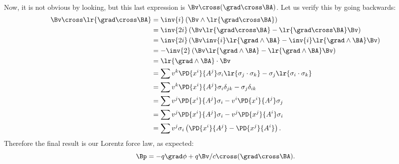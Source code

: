 {\begin{equation}
\begin{aligned}
\end{aligned}
\end{equation}
%
Now, it is not obvious by looking, but this last expression is \(\Bv \cross (\grad \cross \BA)\).  Let us verify this by going backwards:
%
\begin{equation}\label{eqn:tongMf1:640}
\begin{aligned}
\Bv \cross
\lr{ \grad \cross \BA }
&= \inv{i} \left( \Bv \wedge
\lr{  \grad \cross \BA  }
\right) \\
&= \inv{2i} \left( \Bv
\lr{  \grad \cross \BA  }
- \lr{  \grad \cross \BA  }
 \Bv \right) \\
&= \inv{2i} \left( \Bv \inv{i}
\lr{  \grad \wedge \BA  }
 - \inv{i}
\lr{  \grad \wedge \BA  }
 \Bv \right) \\
&= -\inv{2} \left( \Bv
\lr{  \grad \wedge \BA  }
 -
\lr{  \grad \wedge \BA  }
 \Bv \right) \\
&=
\lr{  \grad \wedge \BA  }
\cdot \Bv \\
&= \sum v^k \PD{x^i}{A^j} \sigma_i
\lr{ \sigma_j \cdot \sigma_k } - \sigma_j
\lr{ \sigma_i \cdot \sigma_k } \\
&= \sum v^k \PD{x^i}{A^j} \sigma_i \delta_{jk} - \sigma_j \delta_{ik} \\
&= \sum v^j \PD{x^i}{A^j} \sigma_i -v^i \PD{x^i}{A^j} \sigma_j \\
&= \sum v^j \PD{x^i}{A^j} \sigma_i -v^j \PD{x^j}{A^i} \sigma_i \\
&= \sum v^j \sigma_i \left(\PD{x^i}{A^j} - \PD{x^j}{A^i} \right) .
\end{aligned}
\end{equation}
%
Therefore the final result is our Lorentz force law, as expected:
%
\begin{equation}\label{eqn:tongMf1:1780}
\Bp = -q \grad \phi + q \Bv/c \cross (\grad \cross \BA).
\end{equation}
%
}
